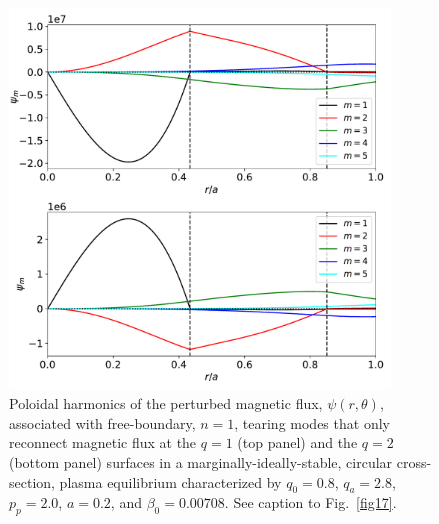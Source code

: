 \documentclass[12pt,prb,aps]{revtex4-1}
\begin{document}
\begin{figure}
\centerline{\includegraphics[width=0.9\textwidth]{Fig19.pdf}}
\caption{Poloidal harmonics of the perturbed magnetic flux, $\psi(r,\theta)$,  associated with free-boundary, $n=1$, tearing modes that only reconnect magnetic flux at the $q=1$  (top panel) and the $q=2$ (bottom panel) surfaces in a marginally-ideally-stable, 
circular cross-section,  plasma equilibrium characterized by $q_0=0.8$, $q_a= 2.8$, $p_p=2.0$, 
$a=0.2$, and $\beta_0=0.00708$. See caption to Fig.~\ref{fig17}.\label{fig19}}
\end{figure}
\end{document}
